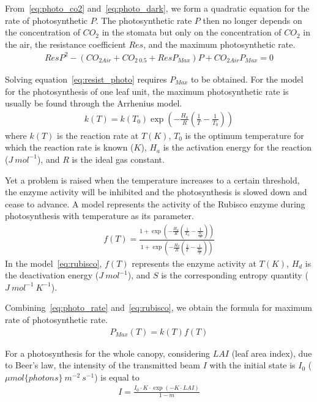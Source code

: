 \documentclass[a4paper]{article}
\numberwithin{equation}{section}
\begin{document}
From~\eqref{eq:photo_co2} and~\eqref{eq:photo_dark}, we form a quadratic equation for the rate of photosynthetic \( P \). The photosynthetic rate \( P \) then no longer depends on the concentration of \( CO_2 \) in the stomata but only on the concentration of \( CO_2 \) in the air, the resistance coefficient \( Res \), and the maximum photosynthetic rate.
\begin{align}
  \label{eq:resist_photo}
  ResP^2 - (CO_{2Air} + CO_{2\ 0.5} + ResP_{Max})P + CO_{2Air}P_{Max} = 0
\end{align}

Solving equation~\eqref{eq:resist_photo} requires \( P_{Max} \) to be obtained. For the model for the photosynthesis of one leaf unit, the maximum photosynthetic rate is usually be found through the Arrhenius model.
\begin{align}
  \label{eq:photo_rate}
  k(T) = k(T_0)\exp \left(-\frac{H_a}{R} \left(\frac{1}{T} - \frac{1}{T_0}\right)\right)
\end{align}
where \( k(T) \) is the reaction rate at \( T(K) \), \( T_0 \) is the optimum temperature for which the reaction
rate is known (\( K \)), \( H_a \) is the activation energy for the reaction (\( J\ mol^{-1} \)), and \( R \) is the ideal gas constant.

Yet a problem is raised when the temperature increases to a certain threshold, the enzyme activity will be inhibited and the photosynthesis is slowed down and cease to advance. A model represents the activity of the Rubisco enzyme during photosynthesis with temperature as its parameter.
\begin{align}
  \label{eq:rubisco}
  f(T) = \frac{1 + \exp \left(-\frac{H_d}{R} \left(\frac{1}{T_0} - \frac{1}{\frac{H_d}{S}}\right)\right)}{1 + \exp \left(-\frac{H_d}{R}\left(\frac{1}{T} - \frac{1}{\frac{H_d}{S}}\right)\right)}
\end{align}
In the model~\eqref{eq:rubisco}, \( f(T) \) represents the enzyme activity at \( T(K) \), \( H_d \) is the deactivation energy (\( J\ mol^{-1} \)), and \( S \) is the corresponding entropy quantity (\( J\ mol^{-1}\ K^{-1} \)).

Combining~\eqref{eq:photo_rate} and~\eqref{eq:rubisco}, we obtain the formula for maximum rate of photosynthetic rate.
\begin{align}
  \label{eq:photo_max}
  P_{Max}(T) = k(T)f(T)
\end{align}

For a photosynthesis for the whole canopy, considering \( LAI \) (leaf area index), due to Beer's law, the intensity of the transmitted beam \( I \) with the initial state is \( I_0 \) (\( \mu mol\{photons\}\ m^{-2}\ s^{-1} \)) is equal to
\begin{align}
  I = \frac{I_0 \cdot K \cdot \exp \left(-K \cdot LAI\right)}{1 - m}
\end{align}
\end{document}
